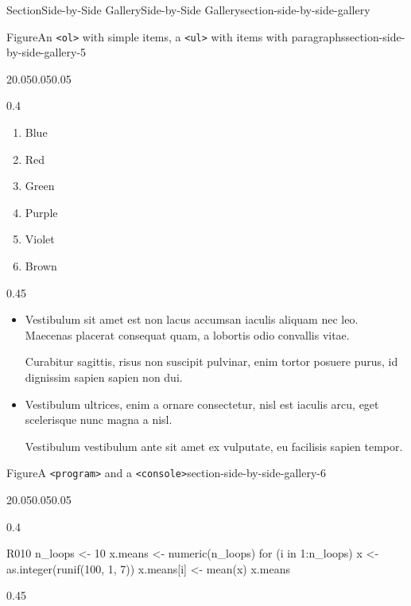 \documentclass[twoside,10pt,]{article}
\newcommand{\mono}[1]{\texttt{#1}}
\numberwithin{equation}{section}
\newcommand{\consoleinput}[1]{\textbf{#1}}
\begin{document}
\begin{sectionptx}{Section}{Side-by-Side Gallery}{}{Side-by-Side Gallery}{}{}{section-side-by-side-gallery}
\begin{figureptx}{Figure}{An \mono{<ol>} with simple items, a \mono{<ul>} with items with paragraphs}{section-side-by-side-gallery-5}{}
\begin{sidebyside}{2}{0.05}{0.05}{0.05}%
\begin{sbspanel}{0.4}%
%
\begin{enumerate}
\item{}Blue%
\item{}Red%
\item{}Green%
\item{}Purple%
\item{}Violet%
\item{}Brown%
\end{enumerate}
\end{sbspanel}%
\begin{sbspanel}{0.45}%
%
\begin{itemize}[label=\textbullet]
\item{}Vestibulum sit amet est non lacus accumsan iaculis aliquam nec leo. Maecenas placerat consequat quam, a lobortis odio convallis vitae.%
\par
Curabitur sagittis, risus non suscipit pulvinar, enim tortor posuere purus, id dignissim sapien sapien non dui.%
\item{}Vestibulum ultrices, enim a ornare consectetur, nisl est iaculis arcu, eget scelerisque nunc magna a nisl.%
\par
Vestibulum vestibulum ante sit amet ex vulputate, eu facilisis sapien tempor.%
\end{itemize}
\end{sbspanel}%
\end{sidebyside}%
\tcblower
\end{figureptx}%
\begin{figureptx}{Figure}{A \mono{<program>} and a \mono{<console>}}{section-side-by-side-gallery-6}{}%
\begin{sidebyside}{2}{0.05}{0.05}{0.05}%
\begin{sbspanel}{0.4}%
\begin{program}{R}{0}{1}{0}
n_loops <- 10
x.means <- numeric(n_loops)
for (i in 1:n_loops){
    x <- as.integer(runif(100, 1, 7))
    x.means[i] <- mean(x)
}
x.means
\end{program}
\end{sbspanel}%
\begin{sbspanel}{0.45}%

\end{sbspanel}
\end{sidebyside}
\end{figureptx}
\end{sectionptx}
\end{document}
